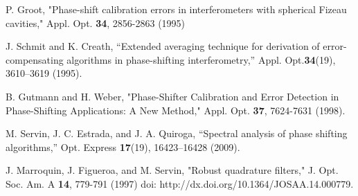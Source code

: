 \begin{thebibliography}{99}
   P. Groot, "Phase-shift calibration errors in 
  interferometers with spherical Fizeau cavities," Appl. Opt. \textbf{34}, 
  2856-2863 (1995) %

 J. Schmit and K. Creath, “Extended averaging technique
for derivation of error-compensating algorithms in phase-shifting
interferometry,” Appl. Opt.\textbf{34}(19), 3610–3619 (1995). 

 B. Gutmann and H. Weber, "Phase-Shifter 
Calibration and Error Detection in Phase-Shifting Applications: A New 
Method," Appl. Opt. \textbf{37}, 7624-7631 (1998).

 M. Servin, J. C. Estrada, and J. A. Quiroga, “Spectral 
analysis of phase shifting algorithms,” Opt. Express \textbf{17}(19),
16423–16428 (2009). %

 J. Marroquin, J. Figueroa, and M. Servin, "Robust 
 quadrature filters," J. Opt.  Soc. Am. A \textbf{14}, 779-791 (1997) 
 doi: http://dx.doi.org/10.1364/JOSAA.14.000779.









\end{thebibliography}
